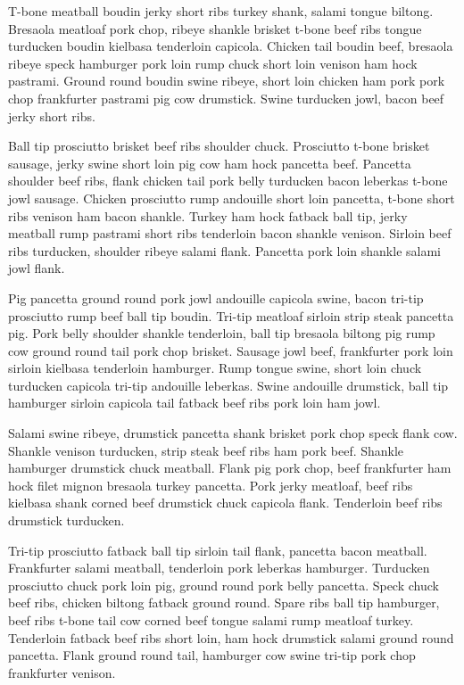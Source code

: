 T-bone meatball boudin jerky short ribs turkey shank, salami tongue biltong. Bresaola meatloaf pork chop, ribeye shankle brisket t-bone beef ribs tongue turducken boudin kielbasa tenderloin capicola. Chicken tail boudin beef, bresaola ribeye speck hamburger pork loin rump chuck short loin venison ham hock pastrami. Ground round boudin swine ribeye, short loin chicken ham pork pork chop frankfurter pastrami pig cow drumstick. Swine turducken jowl, bacon beef jerky short ribs.

Ball tip prosciutto brisket beef ribs shoulder chuck. Prosciutto t-bone brisket sausage, jerky swine short loin pig cow ham hock pancetta beef. Pancetta shoulder beef ribs, flank chicken tail pork belly turducken bacon leberkas t-bone jowl sausage. Chicken prosciutto rump andouille short loin pancetta, t-bone short ribs venison ham bacon shankle. Turkey ham hock fatback ball tip, jerky meatball rump pastrami short ribs tenderloin bacon shankle venison. Sirloin beef ribs turducken, shoulder ribeye salami flank. Pancetta pork loin shankle salami jowl flank.

Pig pancetta ground round pork jowl andouille capicola swine, bacon tri-tip prosciutto rump beef ball tip boudin. Tri-tip meatloaf sirloin strip steak pancetta pig. Pork belly shoulder shankle tenderloin, ball tip bresaola biltong pig rump cow ground round tail pork chop brisket. Sausage jowl beef, frankfurter pork loin sirloin kielbasa tenderloin hamburger. Rump tongue swine, short loin chuck turducken capicola tri-tip andouille leberkas. Swine andouille drumstick, ball tip hamburger sirloin capicola tail fatback beef ribs pork loin ham jowl.

Salami swine ribeye, drumstick pancetta shank brisket pork chop speck flank cow. Shankle venison turducken, strip steak beef ribs ham pork beef. Shankle hamburger drumstick chuck meatball. Flank pig pork chop, beef frankfurter ham hock filet mignon bresaola turkey pancetta. Pork jerky meatloaf, beef ribs kielbasa shank corned beef drumstick chuck capicola flank. Tenderloin beef ribs drumstick turducken.

Tri-tip prosciutto fatback ball tip sirloin tail flank, pancetta bacon meatball. Frankfurter salami meatball, tenderloin pork leberkas hamburger. Turducken prosciutto chuck pork loin pig, ground round pork belly pancetta. Speck chuck beef ribs, chicken biltong fatback ground round. Spare ribs ball tip hamburger, beef ribs t-bone tail cow corned beef tongue salami rump meatloaf turkey. Tenderloin fatback beef ribs short loin, ham hock drumstick salami ground round pancetta. Flank ground round tail, hamburger cow swine tri-tip pork chop frankfurter venison.

